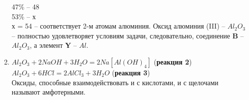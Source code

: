 \begin{enumerate}
    47\% – 48\\
    53\% – х\\
    х = 54 – соответствует 2-м атомам алюминия. Оксид алюминия (III) – $Al_2O_3$ – полностью удовлетворяет условиям задачи, следовательно, соединение \textbf{B} – $Al_2O_3$, а элемент \textbf{Y} – $Al$.
    \item $Al_2O_3 + 2NaOH + 3H_2O = 2Na[Al(OH)_4]$ (\textbf{реакция 2})\\
    $Al_2O_3 + 6HCl = 2AlCl_3 + 3H_2O$ (\textbf{реакция 3})\\
    Оксиды, способные взаимодействовать и с кислотами, и с щелочами называют амфотерными.
\end{enumerate}